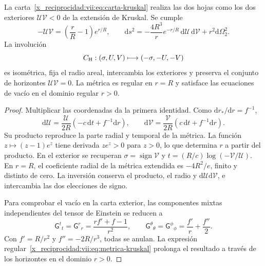 \begin{theorem}
\label{x_reciprocidad:vii:thm:kruskal-hojas}
La carta~\eqref{x_reciprocidad:vii:eq:carta-kruskal} realiza las dos hojas como los
dos exteriores \(\mathcal U\mathcal V<0\) de la extensión de
Kruskal. Se cumple
\begin{equation}
 -\mathcal U\mathcal V=\left(\frac rR-1\right)e^{r/R},\qquad
 \mathrm ds^2=-\frac{4R^3}{r}e^{-r/R}\,
                    \mathrm d\mathcal U\,\mathrm d\mathcal V
                    +r^2\mathrm d\Omega_2^2.
 \label{x_reciprocidad:vii:eq:metrica-kruskal}
\end{equation}
La involución
\begin{equation}
 \mathcal C_{\rm H}:(\sigma,\mathcal U,\mathcal V)
 \longmapsto(-\sigma,-\mathcal U,-\mathcal V)
 \label{x_reciprocidad:vii:eq:involucion-horizonte}
\end{equation}
es isométrica, fija el radio areal, intercambia los exteriores y preserva
el conjunto de horizontes \(\mathcal U\mathcal V=0\).
La métrica es regular en \(r=R\) y satisface las ecuaciones de vacío
en el dominio regular \(r>0\).
\end{theorem}
\begin{proof}
Multiplicar las coordenadas da la primera identidad. Como
\(\mathrm dr_*/\mathrm dr=f^{-1}\),
\[
 \mathrm d\mathcal U=\frac{\mathcal U}{2R}
            (-c\,\mathrm dt+f^{-1}\mathrm dr),\qquad
 \mathrm d\mathcal V=\frac{\mathcal V}{2R}
            ( c\,\mathrm dt+f^{-1}\mathrm dr).
\]
Su producto reproduce la parte radial y temporal de la métrica.
La función \(z\mapsto(z-1)e^z\) tiene derivada \(ze^z>0\)
para \(z>0\), lo que determina \(r\) a partir del producto.
En el exterior se recuperan
\(\sigma=\operatorname{sign}\mathcal V\) y
\(t=(R/c)\log(-\mathcal V/\mathcal U)\).
En \(r=R\), el coeficiente radial de la métrica extendida es
\(-4R^2/e\), finito y distinto de cero. La inversión conserva el
producto, el radio y \(\mathrm d\mathcal U\mathrm d\mathcal V\),
e intercambia las dos elecciones de signo.

Para comprobar el vacío en la carta exterior, las componentes mixtas
independientes del tensor de Einstein se reducen a
\[
 \mathsf G^t{}_t=\mathsf G^r{}_r
 =\frac{rf'+f-1}{r^2},\qquad
 \mathsf G^\theta{}_\theta=\mathsf G^\phi{}_\phi
 =\frac{f'}r+\frac{f''}2.
\]
Con \(f'=R/r^2\) y \(f''=-2R/r^3\), todas se anulan.
La expresión regular~\eqref{x_reciprocidad:vii:eq:metrica-kruskal} prolonga el
resultado a través de los horizontes en el dominio \(r>0\).
\end{proof}

